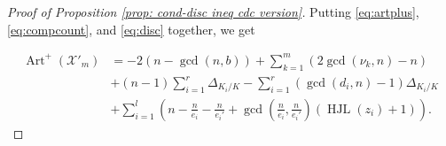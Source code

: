 \documentclass[12pt]{amsart}
\numberwithin{equation}{section}
\theoremstyle{definition}
\newcommand{\X}{\mathcal{X}}
\DeclareMathOperator{\Art}{Art}
\DeclareMathOperator{\HJL}{HJL}
\begin{document}
\begin{proof}[Proof of Proposition \ref{prop: cond-disc ineq cdc version}]
    Putting \eqref{eq:artplus}, \eqref{eq:compcount}, and \eqref{eq:disc} together, we get
   
   
   
   
   \begin{equation}\label{EArtexpression}
    \begin{aligned}
        \Art^+(\X'_m) &=-2(n-\gcd(n,b))+\sum_{k=1}^m(2\gcd(\nu_k,n)-n)\\&+(n-1)\sum_{i=1}^r\Delta_{K_i/K}-\sum_{i=1}^r(\gcd(d_i,n)-1)\Delta_{K_i/K}
        \\&+\sum_{i=1}^l\left(n-\frac{n}{e_i}-\frac{n}{e_i'}+\gcd \left(\frac{n}{e_i},\frac{n}{e_i'} \right)(\HJL(z_i)+1)\right).
      \end{aligned}
      \end{equation}
    
     
   

\end{proof}
\end{document}
